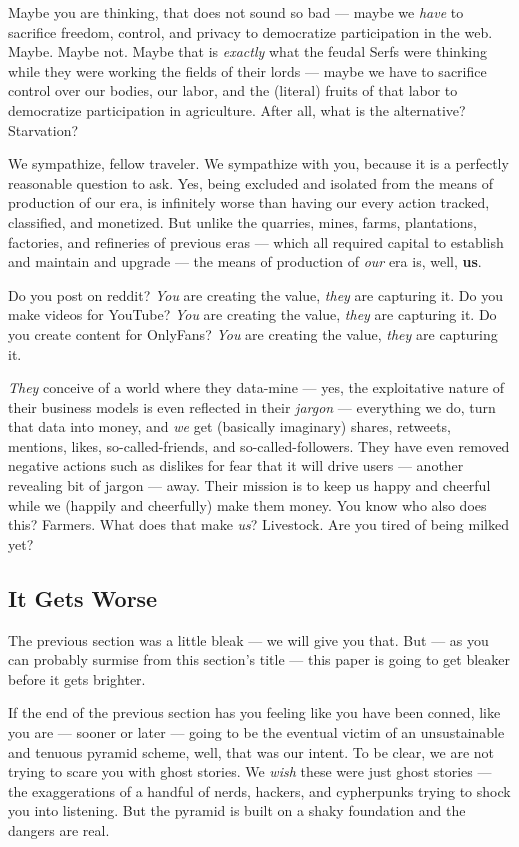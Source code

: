 \documentclass[a4paper]{article}
\begin{document}
Maybe you are thinking, that does not sound so bad --- maybe we \emph{
have} to sacrifice freedom, control, and privacy to democratize
participation in the web. Maybe. Maybe not. Maybe that is \emph{exactly
} what the feudal Serfs were thinking while they were working the fields
of their lords --- maybe we have to sacrifice control over our bodies,
our labor, and the (literal) fruits of that labor to democratize
participation in agriculture. After all, what is the alternative?
Starvation?

We sympathize, fellow traveler. We sympathize with you, because it is a
perfectly reasonable question to ask. Yes, being excluded and isolated
from the means of production of our era, is infinitely worse than having
our every action tracked, classified, and monetized. But unlike the
quarries, mines, farms, plantations, factories, and refineries of
previous eras --- which all required capital to establish and maintain
and upgrade --- the means of production of \emph{our} era is, well,
\textbf{us}.

Do you post on reddit? \emph{You} are creating the value, \emph{they}
are capturing it. Do you make videos for YouTube? \emph{You} are
creating the value, \emph{they} are capturing it. Do you create
content for OnlyFans? \emph{You} are creating the value, \emph{they}
are capturing it.

\emph{They} conceive of a world where they data-mine --- yes, the
exploitative nature of their business models is even reflected in their
\emph{jargon} --- everything we do, turn that data into money, and
\emph{we} get (basically imaginary) shares, retweets, mentions, likes,
so-called-friends, and so-called-followers. They have even removed
negative actions such as dislikes for fear that it will drive users ---
another revealing bit of jargon --- away. Their mission is to keep us
happy and cheerful while we (happily and cheerfully) make them money.
You know who also does this? Farmers. What does that make \emph{us}?
Livestock. Are you tired of being milked yet?

\subsection{It Gets Worse}
The previous section was a little bleak --- we will give you that. But
--- as you can probably surmise from this section's title --- this paper
is going to get bleaker before it gets brighter.

If the end of the previous section has you feeling like you have been
conned, like you are --- sooner or later --- going to be the eventual
victim of an unsustainable and tenuous pyramid scheme, well, that was
our intent. To be clear, we are not trying to scare you with ghost
stories. We \emph{wish} these were just ghost stories --- the
exaggerations of a handful of nerds, hackers, and cypherpunks trying to
shock you into listening. But the pyramid is built on a shaky foundation
and the dangers are real.
\end{document}
